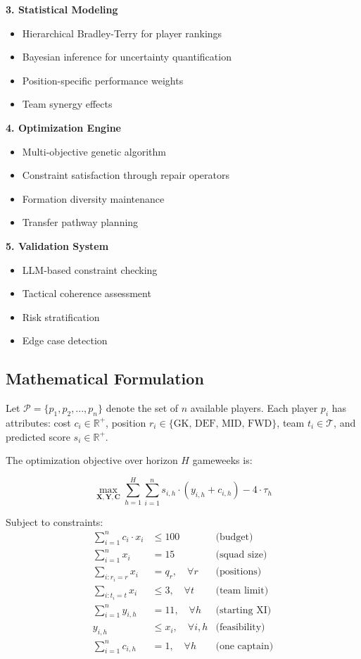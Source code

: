 \documentclass[10pt,a4paper,twocolumn]{article}
\begin{document}
\textbf{3. Statistical Modeling}
\begin{itemize}
\item Hierarchical Bradley-Terry for player rankings
\item Bayesian inference for uncertainty quantification
\item Position-specific performance weights
\item Team synergy effects
\end{itemize}

\textbf{4. Optimization Engine}
\begin{itemize}
\item Multi-objective genetic algorithm
\item Constraint satisfaction through repair operators
\item Formation diversity maintenance
\item Transfer pathway planning
\end{itemize}

\textbf{5. Validation System}
\begin{itemize}
\item LLM-based constraint checking
\item Tactical coherence assessment
\item Risk stratification
\item Edge case detection
\end{itemize}

\subsection*{Mathematical Formulation}

Let $\mathcal{P} = \{p_1, p_2, ..., p_n\}$ denote the set of $n$ available players. Each player $p_i$ has attributes: cost $c_i \in \mathbb{R}^+$, position $r_i \in \{\text{GK, DEF, MID, FWD}\}$, team $t_i \in \mathcal{T}$, and predicted score $s_i \in \mathbb{R}^+$.

The optimization objective over horizon $H$ gameweeks is:

\begin{equation}
\max_{\mathbf{X}, \mathbf{Y}, \mathbf{C}} \sum_{h=1}^{H} \sum_{i=1}^{n} s_{i,h} \cdot (y_{i,h} + c_{i,h}) - 4 \cdot \tau_h
\end{equation}

Subject to constraints:
\begin{align}
\sum_{i=1}^{n} c_i \cdot x_i &\leq 100 & \text{(budget)} \\
\sum_{i=1}^{n} x_i &= 15 & \text{(squad size)} \\
\sum_{i: r_i = r} x_i &= q_r, \quad \forall r & \text{(positions)} \\
\sum_{i: t_i = t} x_i &\leq 3, \quad \forall t & \text{(team limit)} \\
\sum_{i=1}^{n} y_{i,h} &= 11, \quad \forall h & \text{(starting XI)} \\
y_{i,h} &\leq x_i, \quad \forall i,h & \text{(feasibility)} \\
\sum_{i=1}^{n} c_{i,h} &= 1, \quad \forall h & \text{(one captain)}
\end{align}
\end{document}
